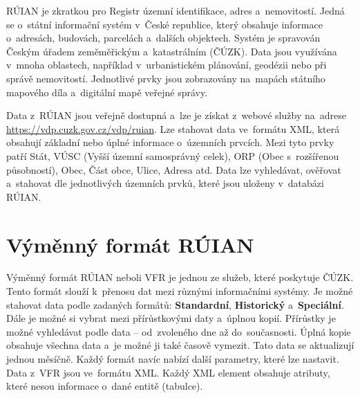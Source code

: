RÚIAN je zkratkou pro Registr územní identifikace, adres a~nemovitostí. 
Jedná se o~státní informační systém v~České republice, který obsahuje 
informace o~adresách, budovách, parcelách a~dalších objektech. Systém 
je spravován Českým úřadem zeměměřickým a~katastrálním (ČÚZK). 
Data jsou využívána v~mnoha oblastech, například v~urbanistickém plánování, 
geodézii nebo při správě nemovitostí. Jednotlivé prvky jsou zobrazovány na~mapách 
státního mapového díla a~digitální mapě veřejné správy.

Data z~RÚIAN jsou veřejně dostupná a~lze je získat z~webové služby na~adrese 
\url{https://vdp.cuzk.gov.cz/vdp/ruian}. Lze stahovat data ve~formátu XML,
která obsahují základní nebo úplné informace o~územních prvcích. Mezi tyto prvky patří
Stát, VÚSC (Vyšší územní samosprávný celek), ORP (Obec s~rozšířenou
působností), Obec, Část obce, Ulice, Adresa atd.
Data lze vyhledávat, ověřovat a~stahovat dle jednotlivých územních prvků, které jsou uloženy v~databázi RÚIAN.

\section{Výměnný formát RÚIAN}
Výměnný formát RÚIAN neboli VFR je jednou ze služeb, které poskytuje
ČÚZK. Tento formát slouží k~přenosu dat mezi různými informačními systémy.
Je možné stahovat data podle zadaných formátů: \textbf{Standardní}, \textbf{Historický} a~\textbf{Speciální}.
Dále je možné si vybrat mezi přírůstkovými daty a~úplnou kopií.
Přírůstky je možné vyhledávat podle data -- od~zvoleného dne až do~současnosti.
Úplná kopie obsahuje všechna data a~je možné ji také časově vymezit. Tato data
se aktualizují jednou měsíčně.
Každý formát navíc nabízí další parametry, které lze nastavit.
Data z~VFR jsou ve~formátu XML.
Každý XML element obsahuje atributy, které nesou informace o~dané entitě (tabulce).

\newpage

